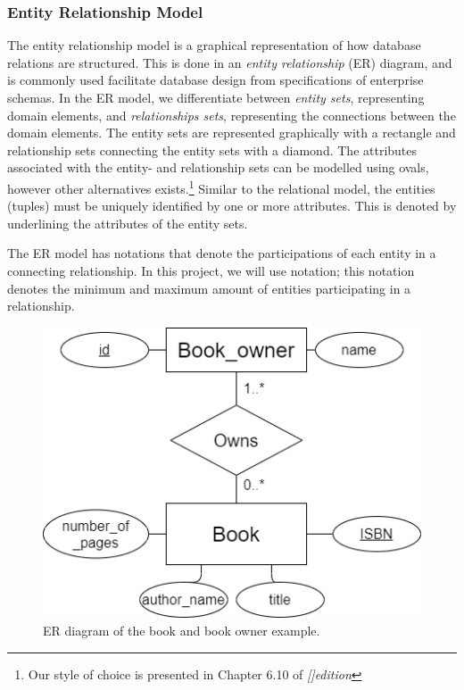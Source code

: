 \subsubsection{Entity Relationship Model}\label{sec:EntityRelationModel}
The entity relationship model is a graphical representation of how database relations are structured.
This is done in an \textit{entity relationship} (ER) diagram, and is commonly used facilitate database design from specifications of enterprise schemas\cite{DBSBook}.
In the ER model, we differentiate between \textit{entity sets}, representing domain elements, and \textit{relationships sets}, representing the connections between the domain elements. 
The entity sets are represented graphically with a rectangle and relationship sets connecting the entity sets with a diamond\cite{DBSBook}.
The attributes associated with the entity- and relationship sets can be modelled using ovals\cite{KatjaFirstPP}, however other alternatives exists.\footnote{Our style of choice is presented in Chapter 6.10 of  \textit{[]{edition}}}
Similar to the relational model, the entities (tuples) must be uniquely identified by one or more attributes. This is denoted by underlining the attributes of the entity sets. 

The ER model has notations that denote the participations of each entity in a connecting relationship\cite{DBSBook}.
In this project, we will use  notation; this notation denotes the minimum and maximum amount of entities participating in a relationship. 

\begin{figure}[htp]
    \centering
    \includegraphics[scale=0.5]{Images/book_example_w_cardinality.png}
    \caption{ER diagram of the book and book owner example.}
    \label{fig:ER_Book_Example}
\end{figure}

